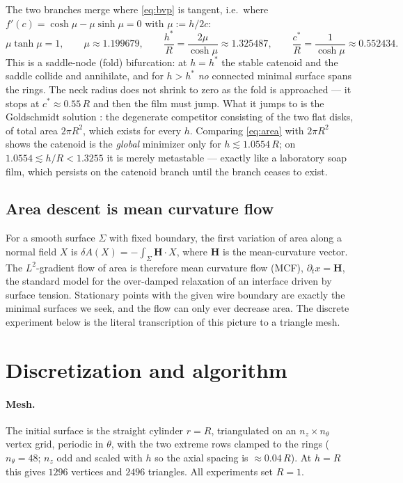\documentclass[11pt,a4paper]{article}
\begin{document}
The two branches merge where \eqref{eq:bvp} is tangent, i.e.\ where
$f'(c)=\cosh\mu-\mu\sinh\mu=0$ with $\mu:=h/2c$:
\begin{equation}
\mu\tanh\mu=1,\qquad \mu\approx1.199679,
\qquad
\frac{h^{*}}{R}=\frac{2\mu}{\cosh\mu}\approx1.325487,
\qquad
\frac{c^{*}}{R}=\frac{1}{\cosh\mu}\approx0.552434 .
\label{eq:fold}
\end{equation}
This is a saddle-node (fold) bifurcation: at $h=h^{*}$ the stable catenoid and
the saddle collide and annihilate, and for $h>h^{*}$ \emph{no} connected
minimal surface spans the rings. The neck radius does not shrink to zero as the
fold is approached --- it stops at $c^{*}\approx0.55\,R$ and then the film must
jump. What it jumps to is the Goldschmidt solution \cite{goldschmidt}: the
degenerate competitor consisting of the two flat disks, of total area $2\pi
R^{2}$, which exists for every $h$. Comparing \eqref{eq:area} with $2\pi R^2$
shows the catenoid is the \emph{global} minimizer only for
$h\lesssim1.0554\,R$; on $1.0554\lesssim h/R<1.3255$ it is merely metastable
--- exactly like a laboratory soap film, which persists on the catenoid branch
until the branch ceases to exist.

\subsection{Area descent is mean curvature flow}

For a smooth surface $\Sigma$ with fixed boundary, the first variation of area
along a normal field $X$ is $\delta A(X)=-\int_\Sigma \mathbf H\cdot X$, where
$\mathbf H$ is the mean-curvature vector. The $L^{2}$-gradient flow of area is
therefore mean curvature flow (MCF), $\partial_t x=\mathbf H$, the standard
model for the over-damped relaxation of an interface driven by surface tension.
Stationary points with the given wire boundary are exactly the minimal surfaces
we seek, and the flow can only ever decrease area. The discrete experiment
below is the literal transcription of this picture to a triangle mesh.

\section{Discretization and algorithm}

\paragraph{Mesh.} The initial surface is the straight cylinder $r=R$,
triangulated on an $n_z\times n_\theta$ vertex grid, periodic in $\theta$, with
the two extreme rows clamped to the rings ($n_\theta=48$; $n_z$ odd and scaled
with $h$ so the axial spacing is $\approx0.04\,R$). At $h=R$ this gives $1296$
vertices and $2496$ triangles. All experiments set $R=1$.
\end{document}
